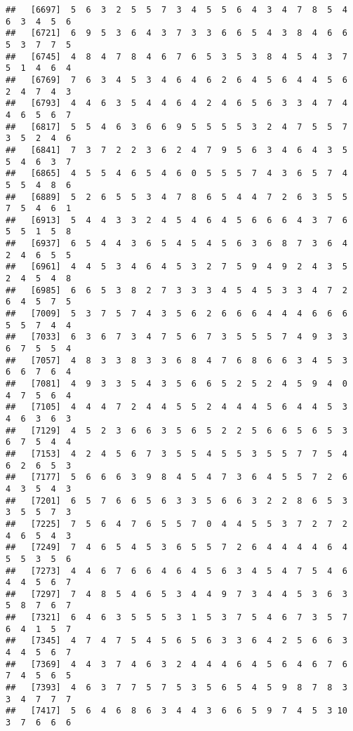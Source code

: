 \documentclass[
]{book}
\begin{document}
\begin{verbatim}
##   [6697]  5  6  3  2  5  5  7  3  4  5  5  6  4  3  4  7  8  5  4  6  3  4  5  6
##   [6721]  6  9  5  3  6  4  3  7  3  3  6  6  5  4  3  8  4  6  6  5  3  7  7  5
##   [6745]  4  8  4  7  8  4  6  7  6  5  3  5  3  8  4  5  4  3  7  5  1  4  6  4
##   [6769]  7  6  3  4  5  3  4  6  4  6  2  6  4  5  6  4  4  5  6  2  4  7  4  3
##   [6793]  4  4  6  3  5  4  4  6  4  2  4  6  5  6  3  3  4  7  4  4  6  5  6  7
##   [6817]  5  5  4  6  3  6  6  9  5  5  5  5  3  2  4  7  5  5  7  3  5  2  4  6
##   [6841]  7  3  7  2  2  3  6  2  4  7  9  5  6  3  4  6  4  3  5  5  4  6  3  7
##   [6865]  4  5  5  4  6  5  4  6  0  5  5  5  7  4  3  6  5  7  4  5  5  4  8  6
##   [6889]  5  2  6  5  5  3  4  7  8  6  5  4  4  7  2  6  3  5  5  7  5  4  6  1
##   [6913]  5  4  4  3  3  2  4  5  4  6  4  5  6  6  6  4  3  7  6  5  5  1  5  8
##   [6937]  6  5  4  4  3  6  5  4  5  4  5  6  3  6  8  7  3  6  4  2  4  6  5  5
##   [6961]  4  4  5  3  4  6  4  5  3  2  7  5  9  4  9  2  4  3  5  2  4  5  4  8
##   [6985]  6  6  5  3  8  2  7  3  3  3  4  5  4  5  3  3  4  7  2  6  4  5  7  5
##   [7009]  5  3  7  5  7  4  3  5  6  2  6  6  6  4  4  4  6  6  6  5  5  7  4  4
##   [7033]  6  3  6  7  3  4  7  5  6  7  3  5  5  5  7  4  9  3  3  6  7  5  5  4
##   [7057]  4  8  3  3  8  3  3  6  8  4  7  6  8  6  6  3  4  5  3  6  6  7  6  4
##   [7081]  4  9  3  3  5  4  3  5  6  6  5  2  5  2  4  5  9  4  0  4  7  5  6  4
##   [7105]  4  4  4  7  2  4  4  5  5  2  4  4  4  5  6  4  4  5  3  4  6  3  6  3
##   [7129]  4  5  2  3  6  6  3  5  6  5  2  2  5  6  6  5  6  5  3  6  7  5  4  4
##   [7153]  4  2  4  5  6  7  3  5  5  4  5  5  3  5  5  7  7  5  4  6  2  6  5  3
##   [7177]  5  6  6  6  3  9  8  4  5  4  7  3  6  4  5  5  7  2  6  4  3  5  4  3
##   [7201]  6  5  7  6  6  5  6  3  3  5  6  6  3  2  2  8  6  5  3  3  5  5  7  3
##   [7225]  7  5  6  4  7  6  5  5  7  0  4  4  5  5  3  7  2  7  2  4  6  5  4  3
##   [7249]  7  4  6  5  4  5  3  6  5  5  7  2  6  4  4  4  4  6  4  5  5  3  5  6
##   [7273]  4  4  6  7  6  6  4  6  4  5  6  3  4  5  4  7  5  4  6  4  4  5  6  7
##   [7297]  7  4  8  5  4  6  5  3  4  4  9  7  3  4  4  5  3  6  3  5  8  7  6  7
##   [7321]  6  4  6  3  5  5  5  3  1  5  3  7  5  4  6  7  3  5  7  6  4  1  5  7
##   [7345]  4  7  4  7  5  4  5  6  5  6  3  3  6  4  2  5  6  6  3  4  4  5  6  7
##   [7369]  4  4  3  7  4  6  3  2  4  4  4  6  4  5  6  4  6  7  6  7  4  5  6  5
##   [7393]  4  6  3  7  7  5  7  5  3  5  6  5  4  5  9  8  7  8  3  3  4  7  7  7
##   [7417]  5  6  4  6  8  6  3  4  4  3  6  6  5  9  7  4  5  3 10  3  7  6  6  6

\end{verbatim}
\end{document}
